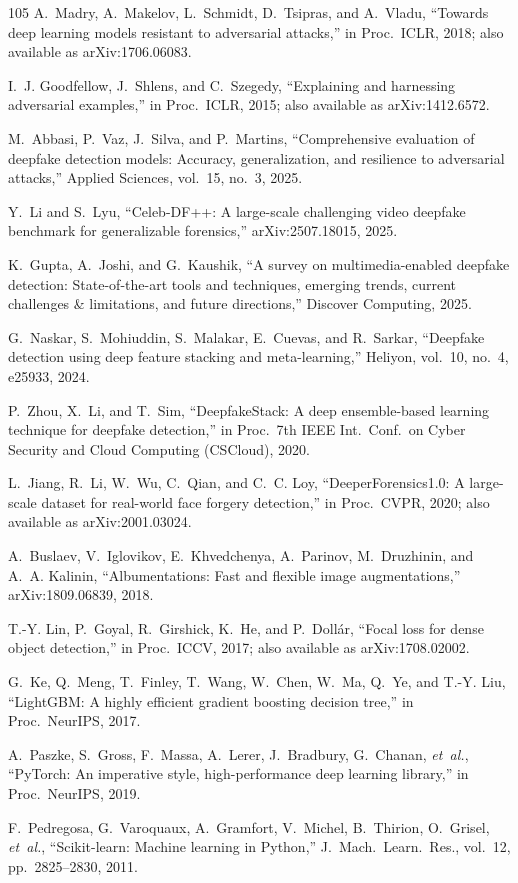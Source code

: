 \begin{thebibliography}{105}
A.~Madry, A.~Makelov, L.~Schmidt, D.~Tsipras, and A.~Vladu, ``Towards deep learning models resistant to adversarial attacks,'' in Proc.\ ICLR, 2018; also available as arXiv:1706.06083.

I.~J. Goodfellow, J.~Shlens, and C.~Szegedy, ``Explaining and harnessing adversarial examples,'' in Proc.\ ICLR, 2015; also available as arXiv:1412.6572.

M.~Abbasi, P.~Vaz, J.~Silva, and P.~Martins, ``Comprehensive evaluation of deepfake detection models: Accuracy, generalization, and resilience to adversarial attacks,'' Applied Sciences, vol.~15, no.~3, 2025.

Y.~Li and S.~Lyu, ``Celeb-DF++: A large-scale challenging video deepfake benchmark for generalizable forensics,'' arXiv:2507.18015, 2025.

K.~Gupta, A.~Joshi, and G.~Kaushik, ``A survey on multimedia-enabled deepfake detection: State-of-the-art tools and techniques, emerging trends, current challenges \& limitations, and future directions,'' Discover Computing, 2025.

G.~Naskar, S.~Mohiuddin, S.~Malakar, E.~Cuevas, and R.~Sarkar, ``Deepfake detection using deep feature stacking and meta-learning,'' Heliyon, vol.~10, no.~4, e25933, 2024.

P.~Zhou, X.~Li, and T.~Sim, ``DeepfakeStack: A deep ensemble-based learning technique for deepfake detection,'' in Proc.\ 7th IEEE Int.\ Conf.\ on Cyber Security and Cloud Computing (CSCloud), 2020.

L.~Jiang, R.~Li, W.~Wu, C.~Qian, and C.~C. Loy, ``DeeperForensics1.0: A large-scale dataset for real-world face forgery detection,'' in Proc.\ CVPR, 2020; also available as arXiv:2001.03024.

A.~Buslaev, V.~Iglovikov, E.~Khvedchenya, A.~Parinov, M.~Druzhinin, and A.~A. Kalinin, ``Albumentations: Fast and flexible image augmentations,'' arXiv:1809.06839, 2018.

T.-Y. Lin, P.~Goyal, R.~Girshick, K.~He, and P.~Doll{\'a}r, ``Focal loss for dense object detection,'' in Proc.\ ICCV, 2017; also available as arXiv:1708.02002.

G.~Ke, Q.~Meng, T.~Finley, T.~Wang, W.~Chen, W.~Ma, Q.~Ye, and T.-Y. Liu, ``LightGBM: A highly efficient gradient boosting decision tree,'' in Proc.\ NeurIPS, 2017.

A.~Paszke, S.~Gross, F.~Massa, A.~Lerer, J.~Bradbury, G.~Chanan, \emph{et~al.}, ``PyTorch: An imperative style, high-performance deep learning library,'' in Proc.\ NeurIPS, 2019.

F.~Pedregosa, G.~Varoquaux, A.~Gramfort, V.~Michel, B.~Thirion, O.~Grisel, \emph{et~al.}, ``Scikit-learn: Machine learning in Python,'' J.\ Mach.\ Learn.\ Res., vol.~12, pp.~2825--2830, 2011.

\end{thebibliography}

